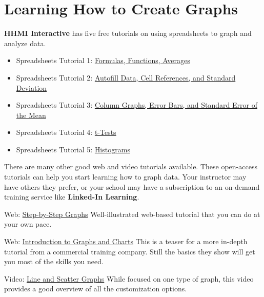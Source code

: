 \documentclass[
]{book}
\providecommand{\tightlist}{%
  \setlength{\itemsep}{0pt}\setlength{\parskip}{0pt}}
\begin{document}
\hypertarget{learning-how-to-create-graphs}{%
\section{Learning How to Create Graphs}\label{learning-how-to-create-graphs}}

\textbf{HHMI Interactive} has five free tutorials on using spreadsheets to graph and analyze data.

\begin{itemize}
\tightlist
\item
  Spreadsheets Tutorial 1: \href{https://www.biointeractive.org/classroom-resources/spreadsheet-tutorial-1-formulae-functions-and-averages}{Formulas, Functions, Averages}
\item
  Spreadsheets Tutorial 2: \href{https://www.biointeractive.org/classroom-resources/spreadsheet-tutorial-2-autofill-data-cell-references-and-standard-deviation}{Autofill Data, Cell References, and Standard Deviation}
\item
  Spreadsheets Tutorial 3: \href{https://www.biointeractive.org/classroom-resources/spreadsheet-tutorial-3-column-graphs-error-bars-and-standard-error-mean}{Column Graphs, Error Bars, and Standard Error of the Mean}
\item
  Spreadsheets Tutorial 4: \href{https://www.biointeractive.org/classroom-resources/spreadsheet-tutorial-4-ttest}{t-Tests}
\item
  Spreadsheets Tutorial 5: \href{https://www.biointeractive.org/classroom-resources/spreadsheet-tutorial-5-histogram}{Histograms}
\end{itemize}

There are many other good web and video tutorials available. These open-access tutorials can help you start learning how to graph data. Your instructor may have others they prefer, or your school may have a subscription to an on-demand training service like \textbf{Linked-In Learning}.

Web: \href{https://www.excel-easy.com/data-analysis/charts.html}{Step-by-Step Graphs}
Well-illustrated web-based tutorial that you can do at your own pace.

Web: \href{https://www.goskills.com/Excel/Resources/Excel-chart-tutorial}{Introduction to Graphs and Charts}
This is a teaser for a more in-depth tutorial from a commercial training company. Still the basics they show will get you most of the skills you need.

Video: \href{https://www.youtube.com/watch?v=0jdX22qM8JA}{Line and Scatter Graphs}
While focused on one type of graph, this video provides a good overview of all the customization options.
\end{document}
